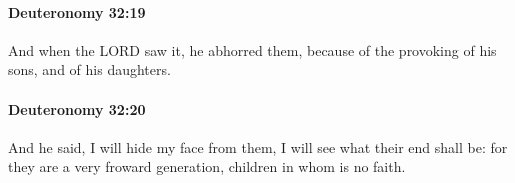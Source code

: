 		\paragraph{Deuteronomy 32:19} %
			\label{DEUTERONOMY-32-19}

			And when the LORD saw it, he abhorred them, because of the provoking of his sons, and of his daughters.


		\paragraph{Deuteronomy 32:20} %
			\label{DEUTERONOMY-32-20}

			And he said, I will hide my face from them, I will see what their end shall be: for they are a very froward generation, children in whom is no faith.


